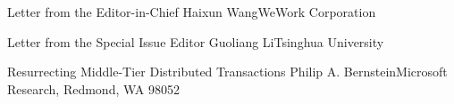 \documentclass[11pt]{article}
\begin{document}


\begin{bulletin}


%
%

\begin{lettersection}


\begin{letter}{Letter from the Editor-in-Chief}
{Haixun Wang}{WeWork Corporation}

\end{letter}
%
\newpage
%
%
\begin{letter}{Letter from the Special Issue Editor}
{Guoliang Li}{Tsinghua University}


\end{letter}

\end{lettersection}


\begin{opinionsection}
\begin{opinion}{Resurrecting Middle-Tier Distributed Transactions}
{Philip A. Bernstein}{Microsoft Research, Redmond, WA 98052}

\end{opinion}
\end{opinionsection}


\end{bulletin}
\end{document}
